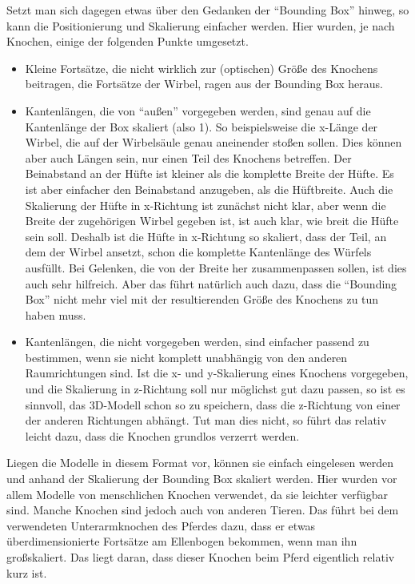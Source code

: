 Setzt man sich dagegen etwas über den Gedanken der "`Bounding Box"' hinweg, so kann die Positionierung und Skalierung einfacher werden. Hier wurden, je nach Knochen, einige der folgenden Punkte umgesetzt. 
\begin{itemize}
 \item Kleine Fortsätze, die nicht wirklich zur (optischen) Größe des Knochens beitragen, \zb die Fortsätze der Wirbel, ragen aus der Bounding Box heraus.
 
 \item Kantenlängen, die von "`außen"' vorgegeben werden, sind genau auf die Kantenlänge der Box skaliert (also 1). So beispielsweise die x-Länge der Wirbel, die auf der Wirbelsäule genau aneinender stoßen sollen. Dies können aber auch Längen sein, nur einen Teil des Knochens betreffen. Der Beinabstand an der Hüfte ist \zb kleiner als die komplette Breite der Hüfte. Es ist aber einfacher den Beinabstand anzugeben, als die Hüftbreite. Auch die Skalierung der Hüfte in x-Richtung ist zunächst nicht klar, aber wenn die Breite der zugehörigen Wirbel gegeben ist, ist auch klar, wie breit die Hüfte sein soll. Deshalb ist die Hüfte in x-Richtung so skaliert, dass der Teil, an dem der Wirbel ansetzt, schon die komplette Kantenlänge des Würfels ausfüllt. Bei Gelenken, die von der Breite her zusammenpassen sollen, ist dies auch sehr hilfreich. Aber das führt natürlich auch dazu, dass die "`Bounding Box"' nicht mehr viel mit der resultierenden Größe des Knochens zu tun haben muss.
 
 \item Kantenlängen, die nicht vorgegeben werden, sind einfacher passend zu bestimmen, wenn sie nicht komplett unabhängig von den anderen Raumrichtungen sind. Ist \zb die x- und y-Skalierung eines Knochens vorgegeben, und die Skalierung in z-Richtung soll nur möglichst gut dazu passen, so ist es sinnvoll, das 3D-Modell schon so zu speichern, dass die z-Richtung von einer der anderen Richtungen abhängt. Tut man dies nicht, so führt das relativ leicht dazu, dass die Knochen grundlos verzerrt werden.
\end{itemize}

Liegen die Modelle in diesem Format vor, können sie einfach eingelesen werden und anhand der Skalierung der Bounding Box skaliert werden.
Hier wurden vor allem Modelle von menschlichen Knochen verwendet, da sie leichter verfügbar sind. Manche Knochen sind jedoch auch von anderen Tieren. Das führt \zb bei dem verwendeten Unterarmknochen des Pferdes dazu, dass er etwas überdimensionierte Fortsätze am Ellenbogen bekommen, wenn man ihn großskaliert. Das liegt daran, dass dieser Knochen beim Pferd eigentlich relativ kurz ist.

